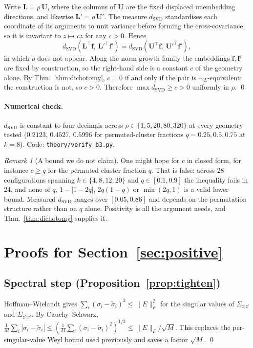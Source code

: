 \documentclass[10pt,letterpaper,twocolumn]{article}
\newcommand{\bff}{\mathbf{f}}
\newcommand{\bfL}{\mathbf{L}}
\newcommand{\dSVD}{d_{\mathrm{SVD}}}
\newcommand{\simL}{\sim_{L}}
\theoremstyle{plain}
\theoremstyle{definition}
\theoremstyle{remark}
\newtheorem{remark}[theorem]{Remark}
\begin{document}
Write $\bfL=\rho\,\mathbf{U}$, where the columns of $\mathbf{U}$ are the fixed
displaced unembedding directions, and likewise $\bfL'=\rho\,\mathbf{U}'$. The
measure $\dSVD$ standardises each coordinate of its arguments to unit variance
before forming the cross-covariance, so it is invariant to $z\mapsto cz$ for
any $c>0$. Hence
\[
\dSVD(\bfL^{\top}\bff,\ \bfL'^{\top}\bff')
=\dSVD(\mathbf{U}^{\top}\bff,\ \mathbf{U}'^{\top}\bff'),
\]
in which $\rho$ does not appear. Along the norm-growth family the embeddings
$\bff,\bff'$ are fixed by construction, so the right-hand side is a constant
$c$ of the geometry alone. By Thm.~\ref{thm:dichotomy}, $c=0$ if and only if
the pair is $\simL$-equivalent; the construction is not, so $c>0$. Therefore
$\max\dSVD\ge c>0$ uniformly in $\rho$. \qed

\paragraph{Numerical check.}
$\dSVD$ is constant to four decimals across $\rho\in\{1,5,20,80,320\}$ at every
geometry tested ($0.2123$, $0.4527$, $0.5996$ for permuted-cluster fractions
$q=0.25,0.5,0.75$ at $k=8$). Code: \texttt{theory/verify\_b3.py}.

\begin{remark}[A bound we do not claim]
One might hope for $c$ in closed form, for instance $c\ge q$ for the
permuted-cluster fraction $q$. That is false: across $28$ configurations
spanning $k\in\{4,8,12,20\}$ and $q\in[0.1,0.9]$ the inequality fails in $24$,
and none of $q$, $1-|1-2q|$, $2q(1-q)$ or $\min(2q,1)$ is a valid lower bound.
Measured $\dSVD$ ranges over $[0.05,0.86]$ and depends on the permutation
structure rather than on $q$ alone. Positivity is all the argument needs, and
Thm.~\ref{thm:dichotomy} supplies it.
\end{remark}

\section{Proofs for Section~\ref{sec:positive}}
\label{app:pos}

\subsection{Spectral step (Proposition~\ref{prop:tighten})}

Hoffman--Wielandt gives $\sum_{i}(\sigma_{i}-\tilde\sigma_{i})^{2}\le\|E\|_{F}^{2}$
for the singular values of $\Sigma_{z'z'}$ and $\Sigma_{z'w'}$. By
Cauchy--Schwarz, $\frac1M\sum_{i}|\sigma_{i}-\tilde\sigma_{i}|
\le(\frac1M\sum_{i}(\sigma_{i}-\tilde\sigma_{i})^{2})^{1/2}\le\|E\|_{F}/\sqrt{M}$.
This replaces the per-singular-value Weyl bound used previously and saves a
factor $\sqrt{M}$. \qed
\end{document}
